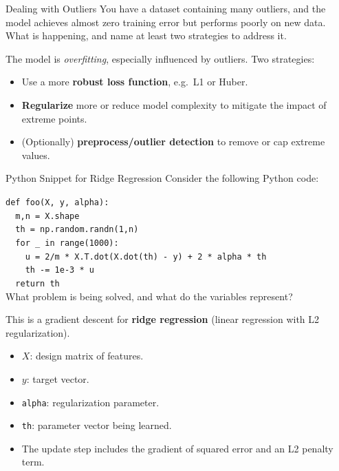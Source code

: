 \documentclass{article}
\begin{document}
\begin{exercise}{Dealing with Outliers}
  You have a dataset containing many outliers, and the model achieves almost zero training error but performs poorly on new data. What is happening, and name at least two strategies to address it.

  \begin{solution}
    The model is \emph{overfitting}, especially influenced by outliers.  
    Two strategies:
    \begin{itemize}
      \item Use a more \textbf{robust loss function}, e.g.\ L1 or Huber.
      \item \textbf{Regularize} more or reduce model complexity to mitigate the impact of extreme points.
      \item (Optionally) \textbf{preprocess/outlier detection} to remove or cap extreme values.
    \end{itemize}
  \end{solution}
\end{exercise}

\begin{exercise}{Python Snippet for Ridge Regression}
  Consider the following Python code:

  \medskip
  \texttt{def foo(X, y, alpha):}\\
  \texttt{\ \ m,n = X.shape}\\
  \texttt{\ \ th = np.random.randn(1,n)}\\
  \texttt{\ \ for \_ in range(1000):}\\
  \texttt{\ \ \ \ u = 2/m * X.T.dot(X.dot(th) - y) + 2 * alpha * th}\\
  \texttt{\ \ \ \ th -= 1e-3 * u}\\
  \texttt{\ \ return th}\\

  What problem is being solved, and what do the variables represent?

  \begin{solution}
    This is a gradient descent for \textbf{ridge regression} (linear regression with L2 regularization).  
    \begin{itemize}
      \item $X$: design matrix of features.
      \item $y$: target vector.
      \item \texttt{alpha}: regularization parameter.
      \item \texttt{th}: parameter vector being learned.
      \item The update step includes the gradient of squared error and an L2 penalty term.
    \end{itemize}
  \end{solution}
\end{exercise}
\end{document}
